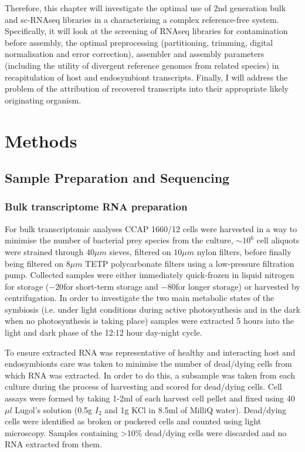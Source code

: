 Therefore, this chapter will investigate the optimal use of 2nd generation bulk and sc-RNAseq libraries
in a characterising a complex reference-free system.  Specifically, it will look at the screening of RNAseq libraries for contamination
before assembly, the optimal preprocessing (partitioning, trimming, digital normalisation and error correction), assembler and assembly
parameters (including the utility of divergent reference genomes from related species) in recapitulation of host and endosymbiont transcripts.
Finally, I will address the problem of the attribution of recovered transcripts into their appropriate likely originating organism.  

\section{Methods} 

\subsection{Sample Preparation and Sequencing}

\subsubsection{Bulk transcriptome RNA preparation}
For bulk transcriptomic analyses CCAP 1660/12 cells were harvested in a way to minimise the 
number of bacterial prey species from the culture, \(\sim 10^{6}\) 
cell aliquots were strained through \(40\mu m\) sieves, filtered on 
\(10 \mu m\) nylon filters, 
before finally being filtered on \(8 \mu m\) TETP polycarbonate filters using a 
low-pressure filtration pump.  Collected samples were either immediately 
quick-frozen in liquid nitrogen for storage (\(-20\)\celsius for short-term storage 
and \(-80\)\celsius for longer storage) or harvested by centrifugation.  
In order to investigate the two main metabolic states of the symbiosis 
(i.e. under light conditions during active photosynthesis and in the dark 
when no photosynthesis is taking place) samples were extracted 5 hours into 
the light and dark phase of the 12:12 hour day-night cycle.

To ensure extracted RNA was representative of healthy and interacting host 
and endosymbionts care was taken to minimise the number of dead/dying cells 
from which RNA was extracted.  In order to do this, a subsample was taken 
from each culture during the process of harvesting and scored for dead/dying cells.  
Cell assays were formed by taking 1-2ml of each harvest cell pellet and 
fixed using 40\(\mu l\) Lugol's solution (0.5g \(I_{2}\) and 1g KCl in 8.5ml 
of MilliQ water). Dead/dying cells were identified as broken or puckered cells 
and counted using light microscopy.  Samples containing >10\% dead/dying cells 
were discarded and no RNA extracted from them.

